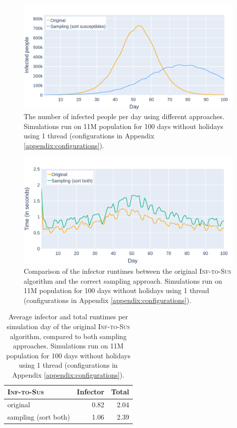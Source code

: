 \begin{figure}
    \centering
    \includegraphics[width=\linewidth]{4 - Sampling/fig/inf_to_sus/its_infections_sampling.png}
    \caption{The number of infected people per day using different approaches. Simulations run on 11M population for 100 days without holidays using 1 thread (configurations in Appendix \ref{appendix:configurations}).}
    \label{fig:its_infections_sampling}
\end{figure}

\begin{figure}
    \centering
    \includegraphics[width=\linewidth]{4 - Sampling/fig/inf_to_sus/its_infectors_sampling.png}
    \caption{Comparison of the infector runtimes between the original \textsc{Inf-to-Sus} algorithm and the correct sampling approach. Simulations run on 11M population for 100 days without holidays using 1 thread (configurations in Appendix \ref{appendix:configurations}).}
    \label{fig:its_infector_sampling}
\end{figure}

\begin{table}
    \centering
    \begin{tabular}{@{}lrr@{}}
    \toprule
        \textsc{Inf-to-Sus}          & Infector & Total \\ \midrule
        original                     & 0.82     & 2.04  \\
        sampling (sort both)         & 1.06     & 2.39  \\ \bottomrule
    \end{tabular}
    \caption{Average infector and total runtimes per simulation day of the original \textsc{Inf-to-Sus} algorithm, compared to both sampling approaches. Simulations run on 11M population for 100 days without holidays using 1 thread (configurations in Appendix \ref{appendix:configurations}).}
    \label{tab:runtimes_its_sampling}
\end{table}

